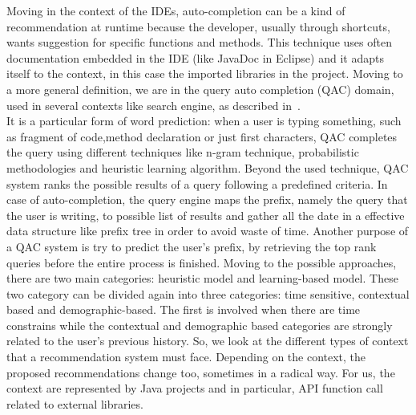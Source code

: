 Moving in the context of the IDEs, auto-completion can be a kind of recommendation at runtime because the developer, usually through shortcuts, wants suggestion for specific functions and methods. This technique uses often documentation embedded in the IDE (like JavaDoc in Eclipse) and it adapts itself  to the context, in this case the imported libraries in the project. Moving to a more general definition, we are in the query auto completion (QAC) domain, used in several contexts like search engine, as described in~\cite{DBLP:journals/ftir/CaiR16}.\\
It is a particular form of word prediction: when a user is typing something, such as fragment of code,method declaration or just first characters, QAC completes the query using different techniques like n-gram technique, probabilistic methodologies and heuristic learning algorithm. Beyond the used technique, QAC system ranks the possible results of a query following a predefined criteria. In case of auto-completion, the query engine maps the prefix, namely the query that the user is writing, to possible list of results and gather all the date in a effective data structure like prefix tree in order to avoid waste of time. Another purpose of a QAC system is try to predict the user's prefix, by retrieving the top rank queries before the entire process is finished. Moving to the possible approaches, there are two main categories: heuristic model and learning-based model. These two category can be divided again into three categories: time sensitive, contextual based and demographic-based. The first is involved when there are time constrains while the contextual and demographic based categories are strongly related to the user's previous history. \newline
So, we look at the different types of context that a recommendation system must face. Depending on the context, the proposed recommendations change too, sometimes in a radical way. For us, the context are represented by Java projects and in particular, API function call related to external libraries.

